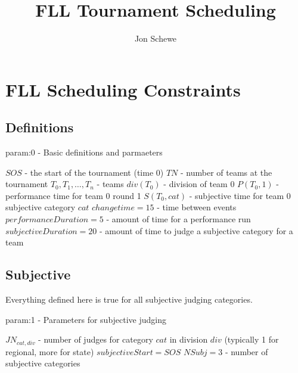 \documentclass[letterpaper,11pt]{report}
\title{FLL Tournament Scheduling}
\author{Jon Schewe}
\begin{document}
\maketitle

\chapter{FLL Scheduling Constraints}

\section{Definitions}

\begin{algorithm}
\caption{param:0 - Basic definitions and parmaeters}
\begin{algorithmic}
\STATE $SOS$ - the start of the tournament (time 0)
\STATE $TN$ - number of teams at the tournament
\STATE $T_{0}, T_{1}, \dots, T_{n}$ - teams
\STATE $div(T_{0})$ - division of team 0
\STATE $P(T_{0}, 1)$ - performance time for team 0 round 1
\STATE $S(T_{0}, cat)$ - subjective time for team 0 subjective category $cat$
\STATE $changetime = 15$ - time between events
\STATE $performanceDuration = 5$ - amount of time for a performance run
\STATE $subjectiveDuration = 20$ - amount of time to judge a subjective
category for a team
\end{algorithmic}
\end{algorithm}

\FloatBarrier
\section{Subjective}

Everything defined here is true for all subjective judging categories.

\begin{algorithm}
\caption{param:1 - Parameters for subjective judging}
\begin{algorithmic}
\STATE $JN_{cat,div}$ - number of judges for category $cat$ in division
$div$ (typically 1 for regional, more for state)
\STATE $subjectiveStart = SOS$
\STATE $NSubj = 3$ - number of subjective categories
\end{algorithmic}
\end{algorithm}
\end{document}

